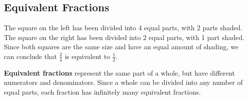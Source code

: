 \documentclass[handout, font=12pt]{ximera}
\begin{document}
\subsection*{Equivalent Fractions}

The square on the left has been divided into 4 equal parts, with 2 parts shaded.  The square on the right has been divided into 2 equal parts, with 
1 part shaded.  Since both squares are the same size and have an equal amount of shading, we can conclude that $\textstyle \frac{2}{4}$ is equivalent to
$\textstyle \frac{1}{2}.$


\begin{center}


\end{center}


\textbf{Equivalent fractions} represent the same part of a whole, but have different numerators and denominators.  Since a whole can be divided
into any number of equal parts, each fraction has infinitely many equivalent fractions.
\end{document}
